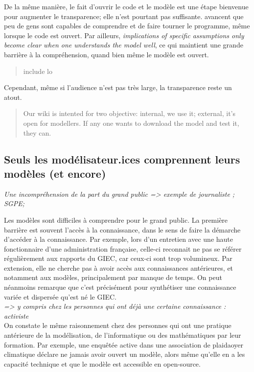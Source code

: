 De la même manière, le fait d'ouvrir le code et le modèle est une étape bienvenue pour augmenter le transparence; elle n'est pourtant pas suffisante. \cite{keppo_exploring_2021} avancent que peu de gens sont capables de comprendre et de faire tourner le programme, même lorsque le code est ouvert. Par ailleurs, \emph{implications of specific assumptions only become clear when one understands the model well}, ce qui maintient une grande barrière à la compréhension, quand bien même le modèle est ouvert. 

\begin{quote}
    include lo
\end{quote}
Cependant, même si l'audience n'est pas très large, la transparence reste un atout. 

\begin{quote}
Our wiki is intented for two objective: internal, we use it; external, it's open for modellers. If any one wants to download the model and test it, they can. 
\end{quote}

\subsection{Seuls les modélisateur.ices comprennent leurs modèles (et encore)}

\textit{Une incompréhension de la part du grand public
=> exemple de journaliste ; SGPE; }

Les modèles sont difficiles à comprendre pour le grand public. La première barrière est souvent l'accès à la connaissance, dans le sens de faire la démarche d'accéder à la connaissance. 
Par exemple, lors d'un entretien avec une haute fonctionnaire d'une administration française, celle-ci reconnait ne pas se référer régulièrement aux rapports du GIEC, car ceux-ci sont trop volumineux. Par extension, elle ne cherche pas à avoir accès aux connaissances antérieures, et notamment aux modèles, principalement par manque de temps. On peut néanmoins remarque que c'est précisément pour synthétiser une connaissance variée et dispersée qu'est né le GIEC. \\

\textit{=> y compris chez les personnes qui ont déjà une certaine connaissance : activiste} \\


On constate le même raisonnement chez des personnes qui ont une pratique antérieure de la modélisation, de l'informatique ou des mathématiques par leur formation. Par exemple, une enquêtée active dans une association de plaidaoyer climatique déclare ne jamais avoir ouvert un modèle, alors même qu'elle en a les capacité technique et que le modèle est accessible en open-source. 


